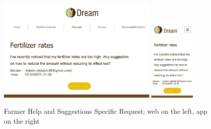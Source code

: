 \documentclass{article}
\begin{document}
        \newpage
        \begin{figure} [h]
            \centering
            \includegraphics[width=0.7\textwidth]{images/UserInterfaces/Farmer/HelpAndSuggestions/SpecificRequestWeb.png}
            \quad
            \includegraphics[width=0.2\textwidth]{images/UserInterfaces/Farmer/HelpAndSuggestions/SpecificRequestApp.png}
            \quad
            \caption{\label{fig:farmerHelpSpecificRequest}Farmer Help and Suggestions Specific Request; web on the left, app on the right}
        \end{figure}
        \newpage
\end{document}
